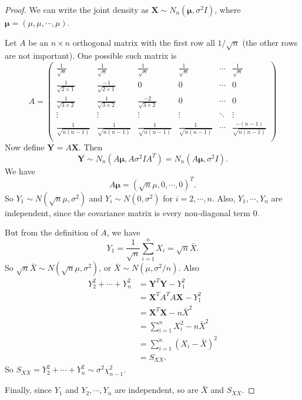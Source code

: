 \documentclass[a4paper]{article}
\begin{document}
\begin{proof}
  We can write the joint density as $\mathbf{X} \sim N_n(\boldsymbol\mu, \sigma^2I)$, where $\boldsymbol\mu = (\mu, \mu, \cdots, \mu)$.

  Let $A$ be an $n\times n$ orthogonal matrix with the first row all $1/\sqrt{n}$ (the other rows are not important). One possible such matrix is
  \[
    A =
    \begin{pmatrix}
      \frac{1}{\sqrt{n}} & \frac{1}{\sqrt{n}} & \frac{1}{\sqrt{n}} & \frac{1}{\sqrt{n}} & \cdots & \frac{1}{\sqrt{n}}\\
      \frac{1}{\sqrt{2\times 1}} & \frac{-1}{\sqrt{2\times 1}} & 0 & 0 & \cdots & 0\\
      \frac{1}{\sqrt{3\times 2}} & \frac{1}{\sqrt{3\times 2}} & \frac{-2}{\sqrt{3\times 2}} & 0 & \cdots & 0\\
      \vdots & \vdots & \vdots & \vdots & \ddots & \vdots \\
      \frac{1}{\sqrt{n(n - 1)}} & \frac{1}{\sqrt{n(n - 1)}} & \frac{1}{\sqrt{n(n - 1)}} & \frac{1}{\sqrt{n(n - 1)}} & \cdots & \frac{-(n - 1)}{\sqrt{n(n - 1)}} \\
    \end{pmatrix}
  \]
  Now define $\mathbf{Y} = A\mathbf{X}$. Then
  \[
    \mathbf{Y} \sim N_n(A\boldsymbol\mu, A\sigma^2IA^T) = N_n(A\boldsymbol\mu, \sigma^2 I).
  \]
  We have
  \[
    A\boldsymbol\mu = (\sqrt{n}\mu, 0, \cdots, 0)^T.
  \]
  So $Y_1 \sim N(\sqrt{n}\mu, \sigma^2)$ and $Y_i \sim N(0, \sigma^2)$ for $i = 2, \cdots, n$. Also, $Y_1, \cdots, Y_n$ are independent, since the covariance matrix is every non-diagonal term $0$.

  But from the definition of $A$, we have
  \[
    Y_1 = \frac{1}{\sqrt{n}}\sum_{i = 1}^n X_i = \sqrt{n} \bar X.
  \]
  So $\sqrt{n} \bar X \sim N(\sqrt{n}\mu, \sigma^2)$, or $\bar X \sim N(\mu, \sigma^2/n)$. Also
  \begin{align*}
    Y_2^2 + \cdots + Y_n^2 &= \mathbf{Y}^T\mathbf{Y} - Y_1^2\\
    &= \mathbf{X}^TA^TA\mathbf{X} - Y_1^2\\
    &= \mathbf{X}^T\mathbf{X} - n\bar X^2\\
    &= \sum_{i = 1}^n X_i^2 - n\bar X^2\\
    &= \sum_{i = 1}^n (X_i - \bar X)^2 \\
    &= S_{XX}.
  \end{align*}
  So $S_{XX} = Y_2^2 + \cdots + Y^2_n \sim \sigma^2 \chi_{n - 1}^2$.

  Finally, since $Y_1$ and $Y_2, \cdots, Y_n$ are independent, so are $\bar X$ and $S_{XX}$.
\end{proof}
\end{document}
